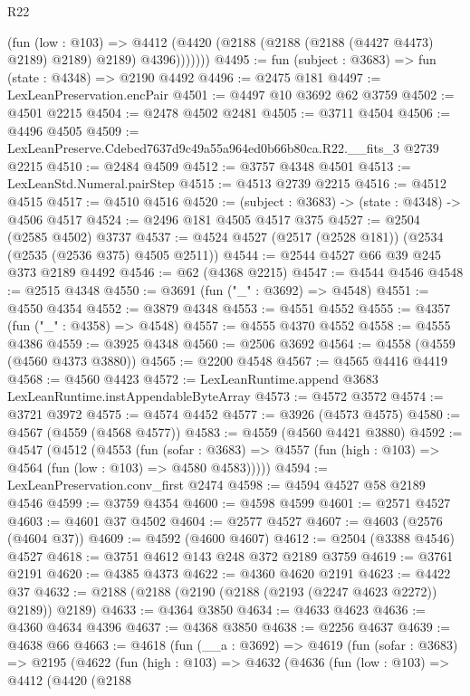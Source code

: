 \begin{lexlean}{R22}
\begin{coremodule}
              (fun (low : @103) =>
              @4412 (@4420 (@2188 (@2188 (@2188 (@4427 @4473) @2189) @2189) @2189) @4396)))))))
@4495 := fun (subject : @3683) => fun (state : @4348) => @2190 @4492
@4496 := @2475 @181
@4497 := LexLeanPreservation.encPair
@4501 := @4497 @10 @3692 @62 @3759
@4502 := @4501 @2215
@4504 := @2478 @4502 @2481
@4505 := @3711 @4504
@4506 := @4496 @4505
@4509 := LexLeanPreserve.Cdebed7637d9c49a55a964ed0b66b80ca.R22.__fits_3 @2739 @2215
@4510 := @2484 @4509
@4512 := @3757 @4348 @4501
@4513 := LexLeanStd.Numeral.pairStep
@4515 := @4513 @2739 @2215
@4516 := @4512 @4515
@4517 := @4510 @4516
@4520 := (subject : @3683) -> (state : @4348) -> @4506 @4517
@4524 := @2496 @181 @4505 @4517 @375
@4527 := @2504 (@2585 @4502) @3737
@4537 := @4524 @4527 (@2517 (@2528 @181)) (@2534 (@2535 (@2536 @375) @4505 @2511))
@4544 := @2544 @4527 @66 @39 @245 @373 @2189 @4492
@4546 := @62 (@4368 @2215)
@4547 := @4544 @4546
@4548 := @2515 @4348
@4550 := @3691 (fun ("_" : @3692) => @4548)
@4551 := @4550 @4354
@4552 := @3879 @4348
@4553 := @4551 @4552
@4555 := @4357 (fun ("_" : @4358) => @4548)
@4557 := @4555 @4370 @4552
@4558 := @4555 @4386
@4559 := @3925 @4348
@4560 := @2506 @3692
@4564 := @4558 (@4559 (@4560 @4373 @3880))
@4565 := @2200 @4548
@4567 := @4565 @4416 @4419
@4568 := @4560 @4423
@4572 := LexLeanRuntime.append @3683 LexLeanRuntime.instAppendableByteArray
@4573 := @4572 @3572
@4574 := @3721 @3972
@4575 := @4574 @4452
@4577 := @3926 (@4573 @4575)
@4580 := @4567 (@4559 (@4568 @4577))
@4583 := @4559 (@4560 @4421 @3880)
@4592 := @4547
    (@4512
      (@4553
        (fun (sofar : @3683) =>
        @4557 (fun (high : @103) => @4564 (fun (low : @103) => @4580 @4583)))))
@4594 := LexLeanPreservation.conv_first @2474
@4598 := @4594 @4527 @58 @2189 @4546
@4599 := @3759 @4354
@4600 := @4598 @4599
@4601 := @2571 @4527
@4603 := @4601 @37 @4502
@4604 := @2577 @4527
@4607 := @4603 (@2576 (@4604 @37))
@4609 := @4592 (@4600 @4607)
@4612 := @2504 (@3388 @4546) @4527
@4618 := @3751 @4612 @143 @248 @372 @2189 @3759
@4619 := @3761 @2191
@4620 := @4385 @4373
@4622 := @4360 @4620 @2191
@4623 := @4422 @37
@4632 := @2188 (@2188 (@2190 (@2188 (@2193 (@2247 @4623 @2272)) @2189)) @2189)
@4633 := @4364 @3850
@4634 := @4633 @4623
@4636 := @4360 @4634 @4396
@4637 := @4368 @3850
@4638 := @2256 @4637
@4639 := @4638 @66
@4663 := @4618
    (fun (__a : @3692) =>
    @4619
      (fun (sofar : @3683) =>
      @2195
        (@4622
          (fun (high : @103) =>
          @4632
            (@4636
              (fun (low : @103) =>
              @4412
                (@4420
                  (@2188

\end{coremodule}
\end{lexlean}
